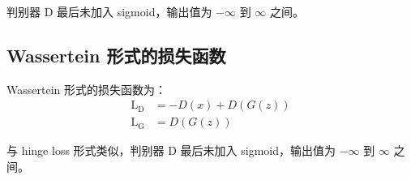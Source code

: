 判别器 D 最后未加入 sigmoid，输出值为 $-\infty$ 到 $\infty$ 之间。

\subsection{Wassertein 形式的损失函数}
Wassertein 形式的损失函数为：
\begin{align}
  \label{equ:origin-GAN-loss}
  \mathrm{L}_{\mathrm{D}} & = -D(x) + D(G(z)) \\
  \mathrm{L}_{\mathrm{G}} & = D(G(z))
\end{align}

与 hinge loss 形式类似，判别器 D 最后未加入 sigmoid，输出值为 $-\infty$ 到 $\infty$ 之间。

